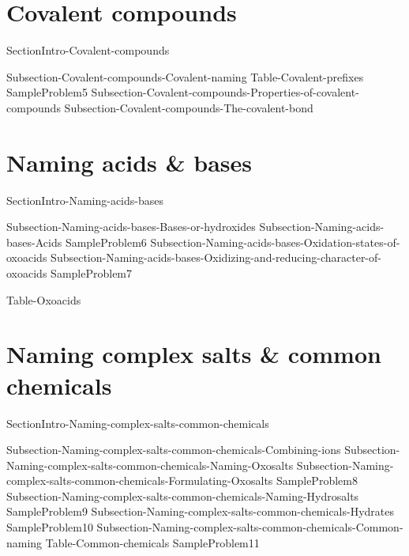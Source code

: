 \documentclass[main.tex]{subfiles}
\begin{document}
\section{Covalent compounds}
{SectionIntro-Covalent-compounds}
\sloppy \begin{description}
{Subsection-Covalent-compounds-Covalent-naming}
 {Table-Covalent-prefixes}	
{SampleProblem5}
{Subsection-Covalent-compounds-Properties-of-covalent-compounds}
{Subsection-Covalent-compounds-The-covalent-bond}
\end{description}
\section{Naming acids \& bases}
{SectionIntro-Naming-acids-bases}
\sloppy \begin{description}
{Subsection-Naming-acids-bases-Bases-or-hydroxides}
{Subsection-Naming-acids-bases-Acids}
{SampleProblem6}
{Subsection-Naming-acids-bases-Oxidation-states-of-oxoacids}
{Subsection-Naming-acids-bases-Oxidizing-and-reducing-character-of-oxoacids}
{SampleProblem7}
\end{description}
 {Table-Oxoacids}
\section{Naming complex salts  \& common chemicals}
{SectionIntro-Naming-complex-salts-common-chemicals}
\sloppy \begin{description}
{Subsection-Naming-complex-salts-common-chemicals-Combining-ions}
{Subsection-Naming-complex-salts-common-chemicals-Naming-Oxosalts}
{Subsection-Naming-complex-salts-common-chemicals-Formulating-Oxosalts}
{SampleProblem8}
{Subsection-Naming-complex-salts-common-chemicals-Naming-Hydrosalts}
{SampleProblem9}
{Subsection-Naming-complex-salts-common-chemicals-Hydrates}
{SampleProblem10}
{Subsection-Naming-complex-salts-common-chemicals-Common-naming}
{Table-Common-chemicals}	
 {SampleProblem11}
\end{description}
\end{document}
